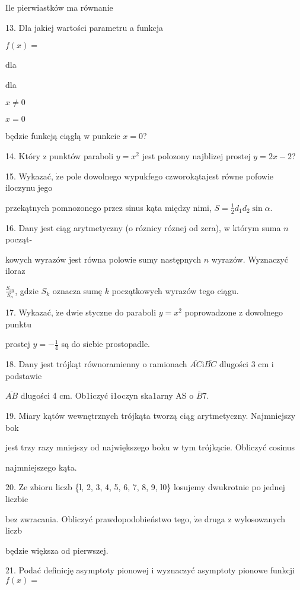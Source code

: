 \documentclass[a4paper,12pt]{article}
\begin{document}
Ile pierwiastków ma równanie

13. Dla jakiej wartości parametru a funkcja

$f(x)=$

dla

dla

$x\neq 0$

$x=0$

będzie funkcją ciąglą w punkcie $x=0$?

14. Który z punktów paraboli $y=x^{2}$ jest polozony najblizej prostej $y=2x-2$?




15. Wykazać, $\dot{\mathrm{z}}\mathrm{e}$ pole dowolnego wypukfego czworokątajest równe pofowie iloczynu jego

przekątnych pomnozonego przez sinus kąta między nimi, $S=\displaystyle \frac{1}{2}d_{1}d_{2}\sin\alpha.$

16. Dany jest ciąg arytmetyczny (o róznicy róznej od zera), w którym suma $n$ począt-

kowych wyrazów jest równa polowie sumy następnych $n$ wyrazów. Wyznaczyć iloraz

$\displaystyle \frac{S_{3n}}{S_{n}}$, gdzie $S_{k}$ oznacza sumę $k$ początkowych wyrazów tego ciągu.

17. Wykazać, $\dot{\mathrm{z}}\mathrm{e}$ dwie styczne do paraboli $y=x^{2}$ poprowadzone z dowolnego punktu

prostej $y=-\displaystyle \frac{1}{4}$ są do siebie prostopadle.

18. Dany jest trójkąt równoramienny o ramionach $\overline{AC}\mathrm{i}\overline{BC}$ dlugości 3 cm i podstawie

$\overline{AB}$ dlugości 4 cm. Ob1iczyć i1oczyn ska1arny AS o $\overline{B}7.$

19. Miary kątów wewnętrznych trójkąta tworzą ciąg arytmetyczny. Najmniejszy bok

jest trzy razy mniejszy od największego boku w tym trójkącie. Obliczyć cosinus

najmniejszego kąta.

20. Ze zbioru liczb \{l, 2, 3, 4, 5, 6, 7, 8, 9, l0\} losujemy dwukrotnie po jednej liczbie

bez zwracania. Obliczyć prawdopodobieństwo tego, $\dot{\mathrm{z}}\mathrm{e}$ druga z wylosowanych liczb

będzie większa od pierwszej.

21. Podać definicję asymptoty pionowej i wyznaczyć asymptoty pionowe funkcji $f(x)=$
\end{document}

